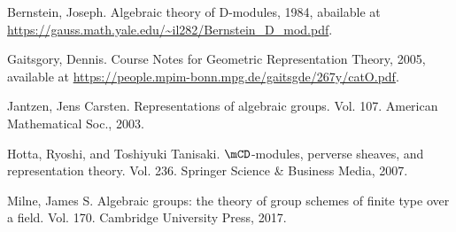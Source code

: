 	

\begin{thebibliography}{Yau}

	 Bernstein, Joseph. Algebraic theory of D-modules, 1984, abailable at \url{https://gauss.math.yale.edu/~il282/Bernstein_D_mod.pdf}.
	

	 Gaitsgory, Dennis. Course Notes for Geometric Representation Theory, 2005, available at \url{https://people.mpim-bonn.mpg.de/gaitsgde/267y/catO.pdf}.

	 Jantzen, Jens Carsten. Representations of algebraic groups. Vol. 107. American Mathematical Soc., 2003.

	 Hotta, Ryoshi, and Toshiyuki Tanisaki. $\mCD$-modules, perverse sheaves, and representation theory. Vol. 236. Springer Science \& Business Media, 2007.

	 Milne, James S. Algebraic groups: the theory of group schemes of finite type over a field. Vol. 170. Cambridge University Press, 2017.
\end{thebibliography}


 


